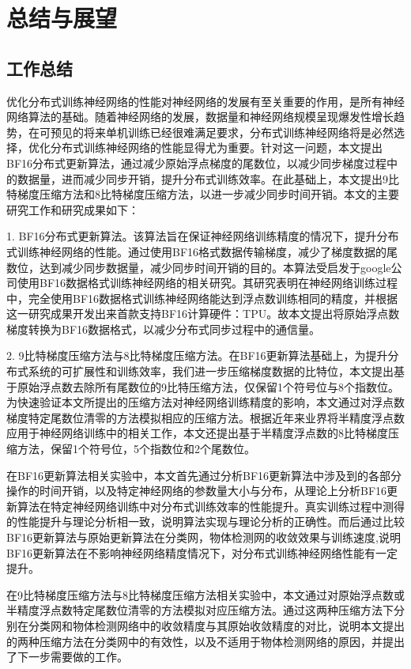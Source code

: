 \chapter{总结与展望}
\section{工作总结}
优化分布式训练神经网络的性能对神经网络的发展有至关重要的作用，是所有神经网络算法的基础。随着神经网络的发展，数据量和神经网络规模呈现爆发性增长趋势，在可预见的将来单机训练已经很难满足要求，分布式训练神经网络将是必然选择，优化分布式训练神经网络的性能显得尤为重要。针对这一问题，本文提出BF16分布式更新算法，通过减少原始浮点梯度的尾数位，以减少同步梯度过程中的数据量，进而减少同步开销，提升分布式训练效率。在此基础上，本文提出9比特梯度压缩方法和8比特梯度压缩方法，以进一步减少同步时间开销。本文的主要研究工作和研究成果如下：

1. BF16分布式更新算法。该算法旨在保证神经网络训练精度的情况下，提升分布式训练神经网络的性能。通过使用BF16格式数据传输梯度，减少了梯度数据的尾数位，达到减少同步数据量，减少同步时间开销的目的。本算法受启发于google公司使用BF16数据格式训练神经网络的相关研究。其研究表明在神经网络训练过程中，完全使用BF16数据格式训练神经网络能达到浮点数训练相同的精度，并根据这一研究成果开发出来首款支持BF16计算硬件：TPU。故本文提出将原始浮点数梯度转换为BF16数据格式，以减少分布式同步过程中的通信量。

2. 9比特梯度压缩方法与8比特梯度压缩方法。在BF16更新算法基础上，为提升分布式系统的可扩展性和训练效率，我们进一步压缩梯度数据的比特位，本文提出基于原始浮点数去除所有尾数位的9比特压缩方法，仅保留1个符号位与8个指数位。为快速验证本文所提出的压缩方法对神经网络训练精度的影响，本文通过对浮点数梯度特定尾数位清零的方法模拟相应的压缩方法。根据近年来业界将半精度浮点数应用于神经网络训练中的相关工作，本文还提出基于半精度浮点数的8比特梯度压缩方法，保留1个符号位，5个指数位和2个尾数位。

在BF16更新算法相关实验中，本文首先通过分析BF16更新算法中涉及到的各部分操作的时间开销，以及特定神经网络的参数量大小与分布，从理论上分析BF16更新算法在特定神经网络训练中对分布式训练效率的性能提升。真实训练过程中测得的性能提升与理论分析相一致，说明算法实现与理论分析的正确性。而后通过比较BF16更新算法与原始更新算法在分类网，物体检测网的收敛效果与训练速度,说明BF16更新算法在不影响神经网络精度情况下，对分布式训练神经网络性能有一定提升。

在9比特梯度压缩方法与8比特梯度压缩方法相关实验中，本文通过对原始浮点数或半精度浮点数特定尾数位清零的方法模拟对应压缩方法。通过这两种压缩方法下分别在分类网和物体检测网络中的收敛精度与其原始收敛精度的对比，说明本文提出的两种压缩方法在分类网中的有效性，以及不适用于物体检测网络的原因，并提出了下一步需要做的工作。
